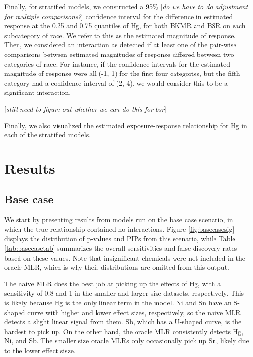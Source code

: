 \documentclass[12pt, twoside]{amherstthesis}
\begin{document}
Finally, for stratified models, we constructed a 95\% {[}\emph{do we have to do adjustment for multiple comparisons?}{]} confidence interval for the difference in estimated response at the 0.25 and 0.75 quantiles of Hg, for both BKMR and BSR on each subcategory of race. We refer to this as the estimated magnitude of response. Then, we considered an interaction as detected if at least one of the pair-wise comparisons between estimated magnitudes of response differed between two categories of race. For instance, if the confidence intervals for the estimated magnitude of response were all (-1, 1) for the first four categories, but the fifth category had a confidence interval of (2, 4), we would consider this to be a significant interaction.

{[}\emph{still need to figure out whether we can do this for bsr}{]}

Finally, we also visualized the estimated exposure-response relationship for Hg in each of the stratified models.

\hypertarget{results}{%
\section{Results}\label{results}}

\hypertarget{base-case}{%
\subsection{Base case}\label{base-case}}

We start by presenting results from models run on the base case scenario, in which the true relationship contained no interactions. Figure \ref{fig:basecasesig} displays the distribution of p-values and PIPs from this scenario, while Table \ref{tab:basecasetab} summarizes the overall sensitivities and false discovery rates based on these values. Note that insignificant chemicals were not included in the oracle MLR, which is why their distributions are omitted from this output.

The naive MLR does the best job at picking up the effects of Hg, with a sensitivity of 0.8 and 1 in the smaller and larger size datasets, respectively. This is likely because Hg is the only linear term in the model. Ni and Sn have an S-shaped curve with higher and lower effect sizes, respectively, so the naive MLR detects a slight linear signal from them. Sb, which has a U-shaped curve, is the hardest to pick up. On the other hand, the oracle MLR consistently detects Hg, Ni, and Sb. The smaller size oracle MLRs only occasionally pick up Sn, likely due to the lower effect sisze.
\end{document}
